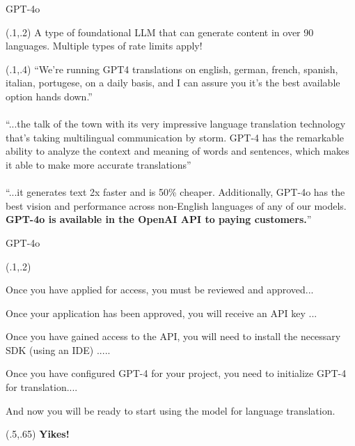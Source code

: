 \documentclass{beamer}
\begin{document}
\begin{frame}{GPT-4o}

\begin{textblock}{1}(.1,.2)
  \small {A type of foundational LLM that can generate content in over 90 languages. Multiple types of rate limits apply!}
\end{textblock}


\begin{textblock}{1}(.1,.4)
  \footnotesize {\enquote{We're running GPT4 translations on english, german, french, spanish, italian, portugese, on a daily basis, and I can assure you it's the best available option hands down.}\\~\\
  \enquote{...the talk of the town with its very impressive language translation technology that's taking multilingual communication by storm. GPT-4 has the remarkable ability to analyze the context and meaning of words and sentences, which makes it able to make more accurate translations}\\~\\
  \enquote{...it generates text 2x faster and is 50\% cheaper. Additionally, GPT-4o has the best vision and performance across non-English languages of any of our models. \textbf{GPT-4o is available in the OpenAI API to paying customers.}}
}
\end{textblock}

\end{frame}


\begin{frame}{GPT-4o}

\begin{textblock}{1}(.1,.2)
  \footnotesize {Once you have applied for access, you must be reviewed and approved...

Once your application has been approved, you will receive an API key ...

Once you have gained access to the API, you will need to install the necessary SDK (using an IDE) ..... 

Once you have configured GPT-4 for your project, you need to initialize GPT-4 for translation....

And now you will be ready to start using the model for language translation.}
\end{textblock}

\begin{textblock}{1}(.5,.65)
  \normalsize{\textbf{Yikes!}}
\end{textblock}

\end{frame}
\end{document}
